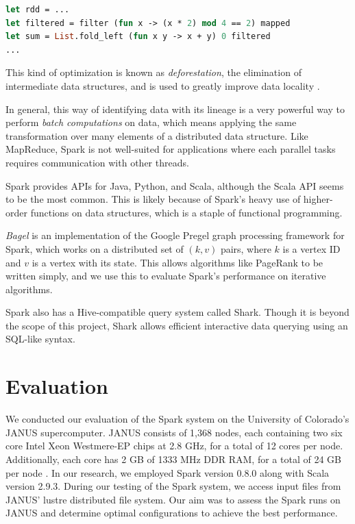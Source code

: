 \documentclass{article}
\begin{document}
\begin{lstlisting}[language=ML]
let rdd = ...
let filtered = filter (fun x -> (x * 2) mod 4 == 2) mapped
let sum = List.fold_left (fun x y -> x + y) 0 filtered
...
\end{lstlisting}

This kind of optimization is known as \emph{deforestation}, the elimination
of intermediate data structures, and is used to greatly improve data
locality \citep{wadler}.

In general, this way of identifying data with its lineage is a very powerful
way to perform \emph{batch computations} on data, which means applying the same
transformation over many elements of a distributed data structure. Like
MapReduce, Spark is not well-suited for applications where each parallel
tasks requires communication with other threads.

Spark provides APIs for Java, Python, and Scala, although the Scala API seems
to be the most common. This is likely because of Spark's heavy use of
higher-order functions on data structures, which is a staple of
functional programming.

\emph{Bagel} is an implementation of the Google Pregel graph processing framework
for Spark, which works on a distributed set of $(k, v)$ pairs, where $k$ is
a vertex ID and $v$ is a vertex with its state. This allows algorithms like
PageRank to be written simply, and we use this to evaluate Spark's performance
on iterative algorithms.

Spark also has a Hive-compatible query system called Shark. Though it is beyond
the scope of this project, Shark allows efficient interactive data querying
using an SQL-like syntax.

\section{Evaluation}
We conducted our evaluation of the Spark system on the University of
Colorado's JANUS supercomputer. JANUS consists of 1,368 nodes, each containing
two six core Intel Xeon Westmere-EP chips at 2.8 GHz, for a total of 12 cores
per node. Additionally, each core has 2 GB of 1333 MHz DDR RAM, for a total of
24 GB per node \citep{tufo}. In our research, we employed Spark version
0.8.0 along with Scala version 2.9.3. During our testing of the Spark system,
we access input files from JANUS' lustre distributed file system. Our aim was
to assess the Spark runs on JANUS and determine optimal configurations to
achieve the best performance.
\end{document}
